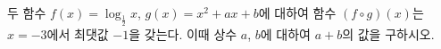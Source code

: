 두 함수 $f(x)=\log_{\frac{1}{2}} x$, $g(x)=x^2+ax+b$에 대하여 함수 $(f\circ g)(x)$는 $x=-3$에서 최댓값 $-1$을 갖는다. 이때 상수 $a$, $b$에 대하여 $a+b$의 값을 구하시오.
